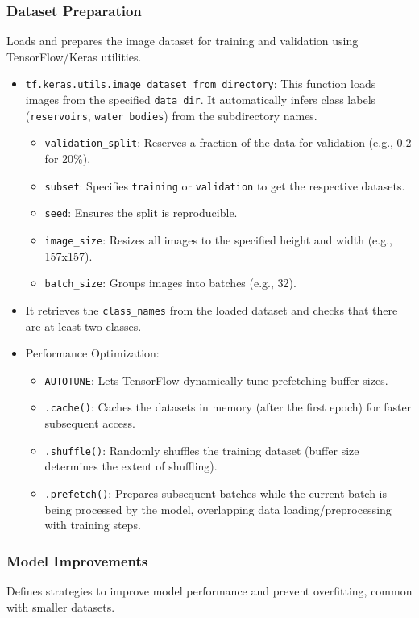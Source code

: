 \subsubsection{Dataset Preparation}
Loads and prepares the image dataset for training and validation using TensorFlow/Keras utilities.
\begin{itemize}
    \item \verb|tf.keras.utils.image_dataset_from_directory|: This function loads images from the specified \verb|data_dir|. It automatically infers class labels (\verb|reservoirs|, \verb|water bodies|) from the subdirectory names.
    \begin{itemize}
        \item \verb|validation_split|: Reserves a fraction of the data for validation (e.g., 0.2 for 20\%).
        \item \verb|subset|: Specifies \verb|training| or \verb|validation| to get the respective datasets.
        \item \verb|seed|: Ensures the split is reproducible.
        \item \verb|image_size|: Resizes all images to the specified height and width (e.g., 157x157).
        \item \verb|batch_size|: Groups images into batches (e.g., 32).
    \end{itemize}
    \item It retrieves the \verb|class_names| from the loaded dataset and checks that there are at least two classes.
    \item Performance Optimization:
    \begin{itemize}
        \item \verb|AUTOTUNE|: Lets TensorFlow dynamically tune prefetching buffer sizes.
        \item \verb|.cache()|: Caches the datasets in memory (after the first epoch) for faster subsequent access.
        \item \verb|.shuffle()|: Randomly shuffles the training dataset (buffer size determines the extent of shuffling).
        \item \verb|.prefetch()|: Prepares subsequent batches while the current batch is being processed by the model, overlapping data loading/preprocessing with training steps.
    \end{itemize}
\end{itemize}


\subsubsection{Model Improvements}
Defines strategies to improve model performance and prevent overfitting, common with smaller datasets.

